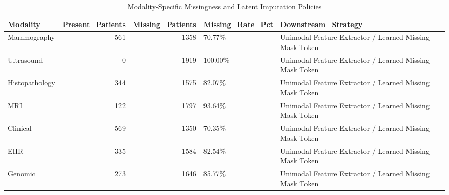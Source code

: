 \begin{table}
\caption{Modality-Specific Missingness and Latent Imputation Policies}
\label{tab:table_missing_modality_summary}
\begin{tabular}{lrrll}
\toprule
Modality & Present\_Patients & Missing\_Patients & Missing\_Rate\_Pct & Downstream\_Strategy \\
\midrule
Mammography & 561 & 1358 & 70.77\% & Unimodal Feature Extractor / Learned Missing Mask Token \\
Ultrasound & 0 & 1919 & 100.00\% & Unimodal Feature Extractor / Learned Missing Mask Token \\
Histopathology & 344 & 1575 & 82.07\% & Unimodal Feature Extractor / Learned Missing Mask Token \\
MRI & 122 & 1797 & 93.64\% & Unimodal Feature Extractor / Learned Missing Mask Token \\
Clinical & 569 & 1350 & 70.35\% & Unimodal Feature Extractor / Learned Missing Mask Token \\
EHR & 335 & 1584 & 82.54\% & Unimodal Feature Extractor / Learned Missing Mask Token \\
Genomic & 273 & 1646 & 85.77\% & Unimodal Feature Extractor / Learned Missing Mask Token \\
\bottomrule
\end{tabular}
\end{table}
